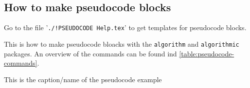

\subsection{How to make pseudocode blocks}

Go to the file '\texttt{./!PSEUDOCODE Help.tex}' to get templates for pseudocode blocks.

This is how to make pseudocode bloacks with the \texttt{algorithm} and
\texttt{algorithmic} packages. An overview of the commands can be found ind
\autoref{table:pseudocode-commands}.

\begin{algorithm}
    \caption{This is the caption/name of the pseudocode example}
    \label{alg:pseudocode}
    \begin{algorithmic}[1]
        \EndFor
            \EndFor
        \EndFunction
    \end{algorithmic}
\end{algorithm}


